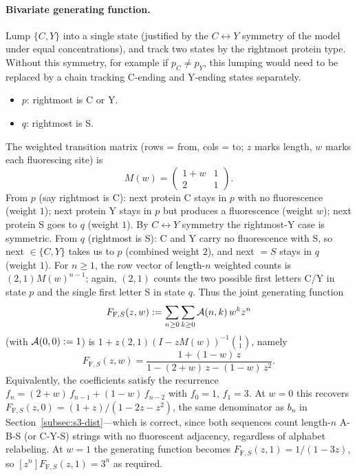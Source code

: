 \documentclass[11pt]{article}
\newcommand{\cA}{ {\cal A} }
\begin{document}
\paragraph{Bivariate generating function.} Lump $\{C, Y\}$ into a single state (justified by the $C \leftrightarrow Y$ symmetry of the model under equal concentrations), and track two states by the rightmost protein type. Without this symmetry, for example if $p_C \neq p_Y$, this lumping would need to be replaced by a chain tracking C-ending and Y-ending states separately.
\begin{itemize}
\item \textbf{$p$}: rightmost is C or Y.
\item \textbf{$q$}: rightmost is S.
\end{itemize}
The weighted transition matrix (rows = from, cols = to; $z$ marks length, $w$ marks each fluorescing site) is
\[
M(w) = \begin{pmatrix} 1 + w & 1 \\ 2 & 1 \end{pmatrix}.
\]
From $p$ (say rightmost is C): next protein C stays in $p$ with no fluorescence (weight $1$); next protein Y stays in $p$ but produces a fluorescence (weight $w$); next protein S goes to $q$ (weight $1$). By $C \leftrightarrow Y$ symmetry the rightmost-Y case is symmetric. From $q$ (rightmost is S): C and Y carry no fluorescence with S, so next $\in \{C, Y\}$ takes us to $p$ (combined weight $2$), and next $= S$ stays in $q$ (weight $1$). For $n \ge 1$, the row vector of length-$n$ weighted counts is $(2,1)M(w)^{n-1}$; again, $(2,1)$ counts the two possible first letters C/Y in state $p$ and the single first letter S in state $q$. Thus the joint generating function
\[
F_{\text{F},S}(z, w) := \sum_{n \ge 0} \sum_{k \ge 0} \cA(n, k)\, w^k z^n
\]
(with $\cA(0, 0) := 1$) is $1+z(2,1)(I-zM(w))^{-1}\binom{1}{1}$, namely
\begin{equation}\label{eq:s5-bivar-gf}
F_{\text{F},S}(z, w) = \frac{1 + (1 - w)\, z}{1 - (2 + w)\, z - (1 - w)\, z^2}.
\end{equation}
Equivalently, the coefficients satisfy the recurrence $f_n = (2 + w)\, f_{n-1} + (1 - w)\, f_{n-2}$ with $f_0 = 1$, $f_1 = 3$. At $w = 0$ this recovers $F_{\text{F},S}(z, 0) = (1 + z)/(1 - 2z - z^2)$, the same denominator as $b_n$ in Section~\ref{subsec:s3-dist}---which is correct, since both sequences count length-$n$ A-B-S (or C-Y-S) strings with no fluorescent adjacency, regardless of alphabet relabeling. At $w = 1$ the generating function becomes $F_{\text{F},S}(z,1)=1/(1-3z)$, so $[z^n]F_{\text{F},S}(z,1)=3^n$ as required.
\end{document}
